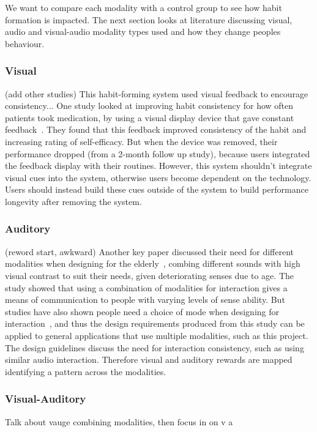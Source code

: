 \documentclass{scaffold/sigchi}
\begin{document}
We want to compare each modality with a control group to see how habit formation is impacted. The next section looks at literature discussing visual, audio and visual-audio modality types used and how they change peoples behaviour.

\subsubsection{Visual}
(add other studies)
This habit-forming system used visual feedback to encourage consistency...
One study looked at improving habit consistency for how often patients took medication,
by using a visual display device that gave constant feedback~\cite{article_realtime_feedback_improving_medication_taking}.
They found that this feedback improved consistency of the habit and increasing rating of self-efficacy.
But when the device was removed, their performance dropped (from a 2-month follow up study), because users integrated the feedback display with their routines.
However, this system shouldn't integrate visual cues into the system, otherwise users become dependent on the technology.
Users should instead build these cues outside of the system to build performance longevity after removing the system.

\subsubsection{Auditory}
(reword start, awkward)
Another key paper discussed their need for different modalities when designing for the elderly~\cite{article_movipill_improving_medication_elders},
combing different sounds with high visual contrast to suit their needs, given deteriorating senses due to age.
The study showed that using a combination of modalities for interaction gives a means of communication to people with varying levels of sense ability.
But studies have also shown people need a choice of mode when designing for interaction~\cite{article_user_centred_multimodal_reminders},
and thus the design requirements produced from this study can be applied to general applications that use multiple modalities, such as this project.
The design guidelines discuss the need for interaction consistency, such as using similar audio interaction.
Therefore visual and auditory rewards are mapped identifying a pattern across the modalities.

\subsubsection{Visual-Auditory}
Talk about vauge combining modalities, then focus in on v a
\end{document}
